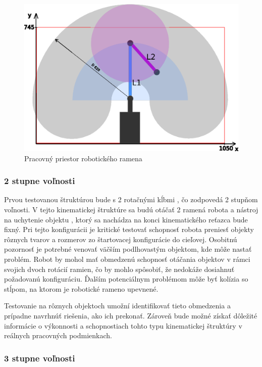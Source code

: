 \begin{figure}[]
	\centering
	\includegraphics[width=120mm]{img/SCARA-workspace.eps}
	\caption{Pracovný priestor robotického ramena}\label{OBRAZOK 1.2.3} 
\end{figure} 


\subsubsection{2 stupne voľnosti}
\label{kap:1.2.1}

Prvou testovanou štruktúrou bude s 2 rotačnými kĺbmi , čo zodpovedá 2 stupňom voľnosti. V tejto kinematickej štruktúre sa budú otáčať 2 ramená robota a nástroj na uchytenie objektu , ktorý sa nachádza na konci kinematického reťazca bude fixný.
Pri tejto konfigurácii je kritické testovať schopnosť robota preniesť objekty rôznych tvarov a rozmerov zo štartovacej konfigurácie do cieľovej. Osobitnú pozornosť je potrebné venovať väčším podlhovastým objektom, kde môže nastať problém. Robot by mohol mať obmedzenú schopnosť otáčania objektov v rámci svojich dvoch rotácií ramien, čo by mohlo spôsobiť, že nedokáže dosiahnuť požadovanú konfiguráciu. Ďalším potenciálnym problémom môže byť kolízia so stĺpom, na ktorom je robotické rameno upevnené.

Testovanie na rôznych objektoch umožní identifikovať tieto obmedzenia a prípadne navrhnúť riešenia, ako ich prekonať. Zároveň bude možné získať dôležité informácie o výkonnosti a schopnostiach tohto typu kinematickej štruktúry v reálnych pracovných podmienkach.


\subsubsection{3 stupne voľnosti}
\label{kap:1.2.2}

